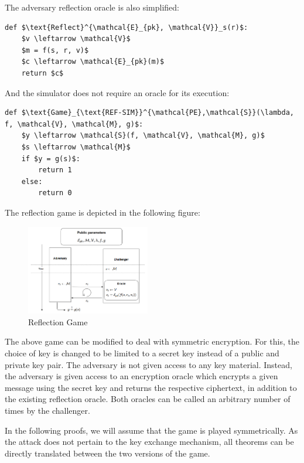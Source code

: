 \documentclass[conference, letterpaper, 10pt]{IEEEtran}
\begin{document}
The adversary reflection oracle is also simplified:

\begin{lstlisting}[texcl,mathescape,basicstyle=\small]
def $\text{Reflect}^{\mathcal{E}_{pk}, \mathcal{V}}_s(r)$:
    $v \leftarrow \mathcal{V}$
    $m = f(s, r, v)$
    $c \leftarrow \mathcal{E}_{pk}(m)$
    return $c$
\end{lstlisting}

And the simulator does not require an oracle for its execution:

\begin{lstlisting}[texcl,mathescape,basicstyle=\small]
def $\text{Game}_{\text{REF-SIM}}^{\mathcal{PE},\mathcal{S}}(\lambda, f, \mathcal{V}, \mathcal{M}, g)$:
    $y \leftarrow \mathcal{S}(f, \mathcal{V}, \mathcal{M}, g)$
    $s \leftarrow \mathcal{M}$
    if $y = g(s)$:
        return 1
    else:
        return 0
\end{lstlisting}

The reflection game is depicted in the following figure:

   \begin{figure}[thpb]
      \centering
      \includegraphics[width=0.48\textwidth]{reflection_game.png}
      \caption{Reflection Game}
   \end{figure}

 The above game can be modified to deal
with symmetric encryption. For this, the choice of key is changed to be limited
to a secret key instead of a public and private key pair. The adversary is not
given access to any key material.  Instead, the adversary is given access to an
encryption oracle which encrypts a given message using the secret key and
returns the respective ciphertext, in addition to the existing reflection
oracle. Both oracles can be called an arbitrary number of times by the
challenger.

In the following proofs, we will assume that the game is played symmetrically.
As the attack does not pertain to the key exchange mechanism, all theorems can
be directly translated between the two versions of the game.
\end{document}
